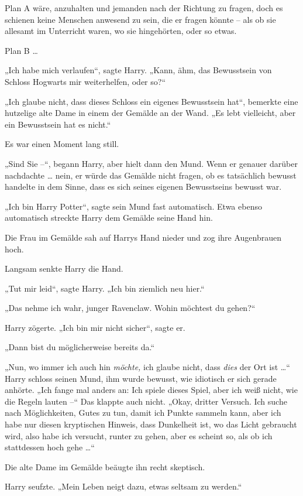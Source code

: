 {Plan A wäre, anzuhalten und jemanden nach der Richtung zu fragen, doch es schienen keine Menschen anwesend zu sein, die er fragen könnte -- als ob sie allesamt im Unterricht waren, wo sie hingehörten, oder so etwas.

Plan B …

„Ich habe mich verlaufen“, sagte Harry. „Kann, ähm, das Bewusstsein von Schloss Hogwarts mir weiterhelfen, oder so?“

„Ich glaube nicht, dass dieses Schloss ein eigenes Bewusstsein hat“, bemerkte eine hutzelige alte Dame in einem der Gemälde an der Wand. „Es lebt vielleicht, aber ein Bewusstsein hat es nicht.“

Es war einen Moment lang still.

„Sind Sie --“, begann Harry, aber hielt dann den Mund. Wenn er genauer darüber nachdachte … nein, er würde das Gemälde nicht fragen, ob es tatsächlich bewusst handelte in dem Sinne, dass es sich seines eigenen Bewusstseins bewusst war.

„Ich bin Harry Potter“, sagte sein Mund fast automatisch. Etwa ebenso automatisch streckte Harry dem Gemälde seine Hand hin.

Die Frau im Gemälde sah auf Harrys Hand nieder und zog ihre Augenbrauen hoch.

Langsam senkte Harry die Hand.

„Tut mir leid“, sagte Harry. „Ich bin ziemlich neu hier.“

„Das nehme ich wahr, junger Ravenclaw. Wohin möchtest du gehen?“

Harry zögerte. „Ich bin mir nicht sicher“, sagte er.

„Dann bist du möglicherweise bereits da.“

„Nun, wo immer ich auch hin \emph{möchte,} ich glaube nicht, dass \emph{dies} der Ort ist …“ Harry schloss seinen Mund, ihm wurde bewusst, wie idiotisch er sich gerade anhörte. „Ich fange mal anders an: Ich spiele dieses Spiel, aber ich weiß nicht, wie die Regeln lauten --“ Das klappte auch nicht. „Okay, dritter Versuch. Ich suche nach Möglichkeiten, Gutes zu tun, damit ich Punkte sammeln kann, aber ich habe nur diesen kryptischen Hinweis, dass Dunkelheit ist, wo das Licht gebraucht wird, also habe ich versucht, runter zu gehen, aber es scheint so, als ob ich stattdessen hoch gehe …“

Die alte Dame im Gemälde beäugte ihn recht skeptisch.

Harry seufzte. „Mein Leben neigt dazu, etwas seltsam zu werden.“

}
